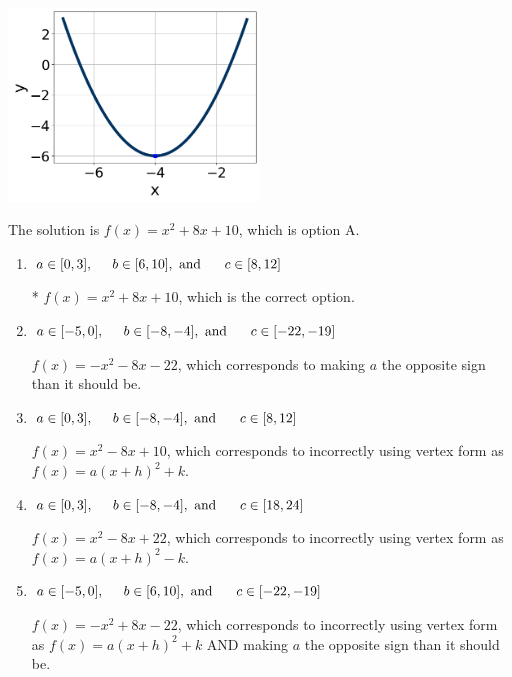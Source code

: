 \documentclass{extbook}[14pt]
\begin{document}
\begin{enumerate}
{\begin{center}
    \includegraphics[width=0.5\textwidth]{../Figures/quadraticGraphToEquationB.png}
\end{center}




The solution is \( f(x) = x^{2} +8 x + 10 \), which is option A.\begin{enumerate}[label=\Alph*.]
\item \( a \in [0, 3], \hspace*{5mm} b \in [6, 10], \text{ and } \hspace*{5mm} c \in [8, 12] \)

* $f(x)=x^{2} +8 x + 10$, which is the correct option.
\item \( a \in [-5, 0], \hspace*{5mm} b \in [-8, -4], \text{ and } \hspace*{5mm} c \in [-22, -19] \)

$f(x)=-x^{2} -8 x -22$, which corresponds to making $a$ the opposite sign than it should be.
\item \( a \in [0, 3], \hspace*{5mm} b \in [-8, -4], \text{ and } \hspace*{5mm} c \in [8, 12] \)

$f(x)=x^{2} -8 x + 10$, which corresponds to incorrectly using vertex form as $f(x) = a(x+h)^2+k$.
\item \( a \in [0, 3], \hspace*{5mm} b \in [-8, -4], \text{ and } \hspace*{5mm} c \in [18, 24] \)

$f(x)=x^{2} -8 x + 22$, which corresponds to incorrectly using vertex form as $f(x) = a(x+h)^2 - k$.
\item \( a \in [-5, 0], \hspace*{5mm} b \in [6, 10], \text{ and } \hspace*{5mm} c \in [-22, -19] \)

$f(x)=-x^{2} +8 x -22$, which corresponds to incorrectly using vertex form as $f(x) = a(x+h)^2+k$ AND making $a$ the opposite sign than it should be.
\end{enumerate}

}
\end{enumerate}
\end{document}
